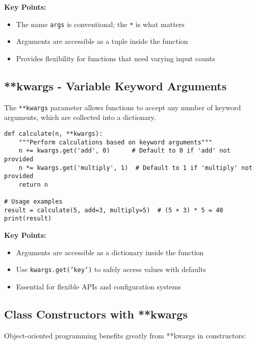 \documentclass[12pt,a4paper]{article}
\begin{document}
\textbf{Key Points:}
\begin{itemize}
    \item The name \texttt{args} is conventional; the \texttt{*} is what matters
    \item Arguments are accessible as a tuple inside the function
    \item Provides flexibility for functions that need varying input counts
\end{itemize}

\subsection{**kwargs - Variable Keyword Arguments}

The \texttt{**kwargs} parameter allows functions to accept any number of keyword arguments, which are collected into a dictionary.

\begin{tcolorbox}[colback=green!5!white,colframe=green!75!black,title=**kwargs Example]
\begin{lstlisting}
def calculate(n, **kwargs):
    """Perform calculations based on keyword arguments"""
    n += kwargs.get('add', 0)      # Default to 0 if 'add' not provided
    n *= kwargs.get('multiply', 1)  # Default to 1 if 'multiply' not provided
    return n

# Usage examples
result = calculate(5, add=3, multiply=5)  # (5 + 3) * 5 = 40
print(result)
\end{lstlisting}
\end{tcolorbox}

\textbf{Key Points:}
\begin{itemize}
    \item Arguments are accessible as a dictionary inside the function
    \item Use \texttt{kwargs.get('key')} to safely access values with defaults
    \item Essential for flexible APIs and configuration systems
\end{itemize}

\subsection{Class Constructors with **kwargs}

Object-oriented programming benefits greatly from **kwargs in constructors:
\end{document}
